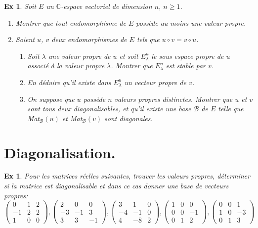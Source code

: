 \documentclass[a4paper,11pt]{article}
\theoremstyle{plain}
\newtheorem{ex}[thm]{Ex}{\theorembodyfont{\upshape}}
\newcommand{\C}{\mathbb{C}}
\newcommand{\BC}{\mathcal{B}}
\begin{document}
\begin{ex}
Soit $E$ un $\C$-espace vectoriel de dimension $n$, $n\geq 1$.
\begin{enumerate}
\item Montrer que tout endomorphisme de $E$ poss\`ede au moins une valeur propre.
\item Soient $u$, $v$ deux endomorphismes de $E$ tels que $u\circ v=v\circ u$.

\begin{enumerate}
\item Soit $\lambda $ une valeur propre de $u$ et soit $E^u_\lambda $ le sous espace propre de $u$
associ\'e \`a la valeur propre $\lambda $. Montrer que $E^u_\lambda $ est stable par $v$.
\item En d\'eduire qu'il existe dans $E^u_\lambda $ un vecteur propre de $v$.
\item On suppose que $u$ poss\`ede $n$ valeurs propres distinctes. Montrer que $u$ et $v$ sont tous deux diagonalisables,
et qu'il existe une base $\BC$ de $E$ telle que Mat$_\BC(u)$ et Mat$_\BC(v)$ sont diagonales.
\end{enumerate}
\end{enumerate}
\end{ex}


 \section{Diagonalisation.}

\begin{ex}
Pour les matrices r\'eelles suivantes, trouver les valeurs propres, d\'eterminer si la matrice est diagonalisable et dans ce cas donner 
une base de vecteurs propres:
$$\left(
\begin{array}{ccc}
0&1 &2\\
 -1&2&2 \\
  1&0  &0
\end{array}
\right),
\left(
\begin{array}{ccc}
2&0 &0\\
 -3&-1&3 \\
  3&3  &-1
\end{array}
\right),
\left(
\begin{array}{ccc}
3&1 &0\\
 -4&-1&0 \\
  4&-8  &2
\end{array}
\right),
\left(
\begin{array}{ccc}
1&0 &0\\
 0&0&-1 \\
  0&1&2
\end{array}
\right),
\left(
\begin{array}{ccc}
0&0&1\\
 1&0&-3 \\
  0&1  &3
\end{array}
\right)$$


\end{ex}
\end{document}

